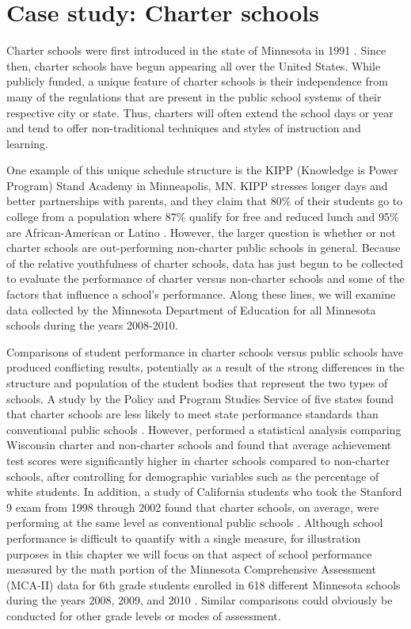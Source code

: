 \documentclass[
]{krantz}
\begin{document}
\hypertarget{cs:charter}{%
\section{Case study: Charter schools}\label{cs:charter}}

Charter schools were first introduced in the state of Minnesota in 1991 \citep{CharterSchools}. Since then, charter schools have begun appearing all over the United States. While publicly funded, a unique feature of charter schools is their independence from many of the regulations that are present in the public school systems of their respective city or state. Thus, charters will often extend the school days or year and tend to offer non-traditional techniques and styles of instruction and learning.

One example of this unique schedule structure is the KIPP (Knowledge is Power Program) Stand Academy in Minneapolis, MN. KIPP stresses longer days and better partnerships with parents, and they claim that 80\% of their students go to college from a population where 87\% qualify for free and reduced lunch and 95\% are African-American or Latino \citep{KIPP}. However, the larger question is whether or not charter schools are out-performing non-charter public schools in general. Because of the relative youthfulness of charter schools, data has just begun to be collected to evaluate the performance of charter versus non-charter schools and some of the factors that influence a school's performance. Along these lines, we will examine data collected by the Minnesota Department of Education for all Minnesota schools during the years 2008-2010.

Comparisons of student performance in charter schools versus public schools have produced conflicting results, potentially as a result of the strong differences in the structure and population of the student bodies that represent the two types of schools. A study by the Policy and Program Studies Service of five states found that charter schools are less likely to meet state performance standards than conventional public schools \citep{DepartmentOfEducation2004}. However, \citet{Witte2007} performed a statistical analysis comparing Wisconsin charter and non-charter schools and found that average achievement test scores were significantly higher in charter schools compared to non-charter schools, after controlling for demographic variables such as the percentage of white students. In addition, a study of California students who took the Stanford 9 exam from 1998 through 2002 found that charter schools, on average, were performing at the same level as conventional public schools \citep{Buddin2005}. Although school performance is difficult to quantify with a single measure, for illustration purposes in this chapter we will focus on that aspect of school performance measured by the math portion of the Minnesota Comprehensive Assessment (MCA-II) data for 6th grade students enrolled in 618 different Minnesota schools during the years 2008, 2009, and 2010 \citep{MNDepartmentOfEducation}. Similar comparisons could obviously be conducted for other grade levels or modes of assessment.
\end{document}
